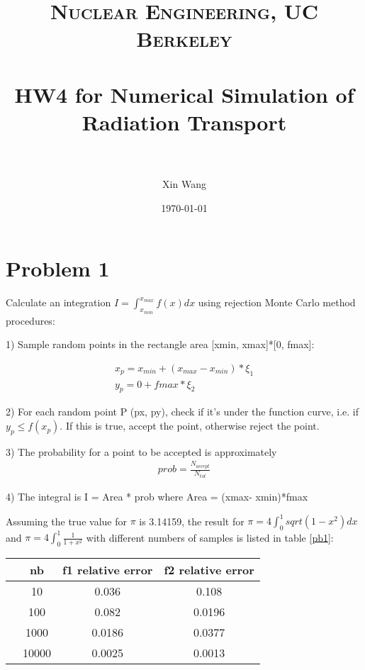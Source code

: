 \documentclass[paper=a4, fontsize=11pt]{article} %
\title{ 
\normalfont \normalsize 
\textsc{Nuclear Engineering, UC Berkeley} \\ [25pt] %
\horrule{0.5pt} \\[0.4cm] %
\huge HW4 for Numerical Simulation of Radiation Transport\\ %
\horrule{2pt} \\[0.5cm] %
}
\author{Xin Wang} %
\date{\normalsize\today} %
\newcommand{\ra}[1]{\renewcommand{\arraystretch}{#1}}
\begin{document}
\maketitle %




\section*{Problem 1}
Calculate an integration $I = \int_{x_{min}}^{x_{max}}f(x) dx$ using rejection Monte Carlo method procedures:

1) Sample random points in the rectangle area [xmin, xmax]*[0, fmax]:

\begin{eqnarray}
x_p = x_{min} + (x_{max}-x_{min})*\xi_1 \nonumber\\
y_p = 0 + fmax * \xi_2
\end{eqnarray}

2) For each random point P (px, py), check if it's under the function curve, i.e. if $y_p \leq f(x_p)$.
If this is true, accept the point, otherwise reject the point. 

3) The probability for a point to be accepted is approximately 
\begin{eqnarray}
prob = \frac{N_{accept}}{N_{tot}}
\end{eqnarray}

4) The integral is I = Area * prob where Area = (xmax- xmin)*fmax

Assuming the true value for $\pi$ is 3.14159, the result for $\pi = 4\int_0^1 sqrt(1-x^2) dx$ and $\pi = 4\int_0^1 \frac{1}{1+x^2}$ with different numbers of samples is listed in table \ref{pb1}:

\begin{table*}[h]\centering
\ra{1.3}
\begin{tabular}{@{}cccc@{}}\toprule
  & nb & f1 relative error & f2 relative error \\ \midrule
    & 10         & 0.036     &0.108 \\
    & 100        & 0.082    &0.0196 \\
    & 1000         & 0.0186 & 0.0377 \\
    & 10000        & 0.0025 & 0.0013 \\
\bottomrule
\end{tabular}
\caption{Relative error of rejection Monte Carlo method for integral calculation}
\label{pb1}
\end{table*}
\end{document}
